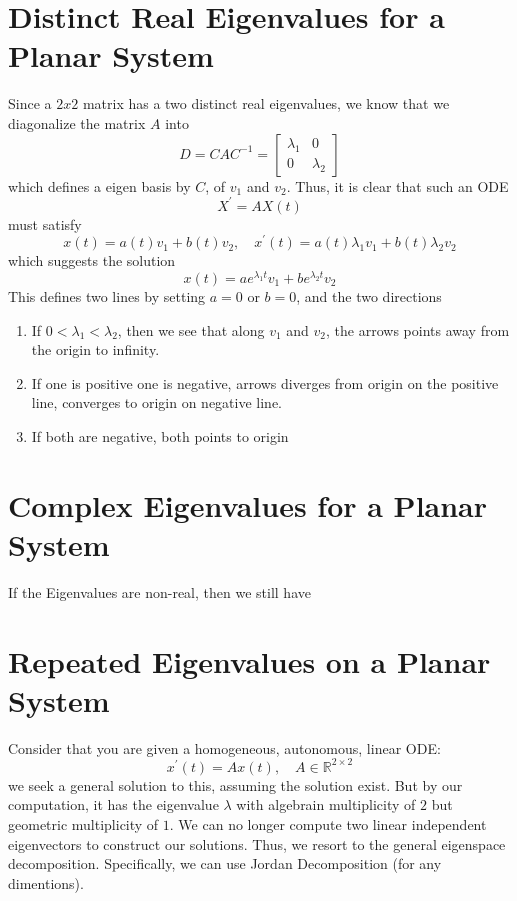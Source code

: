 \documentclass[a4paper, 12pt]{book}
\begin{document}
\section{Distinct Real Eigenvalues for a Planar System}
Since a \( 2x2 \) matrix has a two distinct real eigenvalues, we know that we diagonalize the matrix \( A \) into
\[
	D=CAC^{-1}=
	\begin{bmatrix}
		\lambda_1 & 0         \\
		0         & \lambda_2
	\end{bmatrix}
\]
which defines a eigen basis by \( C \), of \( v_1 \) and \( v_2 \).
Thus, it is clear that such an ODE \[
	X^\prime=AX(t)
\]
must satisfy
\[
	x(t)=a(t)v_1+b(t)v_2, \quad x^\prime(t)=a(t)\lambda_1v_1+b(t)\lambda_2v_2
\]
which suggests the solution
\[
	x(t)=ae^{\lambda_1 t} v_1 + b e^{\lambda_2t} v_2
\]
This defines two lines by setting \( a=0 \) or \( b=0 \), and the two directions
\begin{enumerate}
	\item If \( 0<\lambda_1<\lambda_2 \), then we see that along \( v_1 \) and \( v_2 \), the arrows points away from the origin to infinity.
	\item If one is positive one is negative, arrows diverges from origin on the positive line, converges to origin on negative line.
	\item If both are negative, both points to origin
\end{enumerate}
\section{Complex Eigenvalues for a Planar System}
If the Eigenvalues are non-real, then we still have

\section{Repeated Eigenvalues on a Planar System}
Consider that you are given a homogeneous, autonomous, linear ODE:
\[
	x^\prime (t)=A x(t), \quad A\in \mathbb{R}^{2\times 2}
\]
we seek a general solution to this, assuming the solution exist. But by our computation, it has the eigenvalue \( \lambda \) with algebrain multiplicity of \( 2 \) but geometric multiplicity of \( 1 \). We can no longer compute two linear independent eigenvectors to construct our solutions. Thus, we resort to the general eigenspace decomposition. Specifically, we can use Jordan Decomposition (for any dimentions). \\
\end{document}
